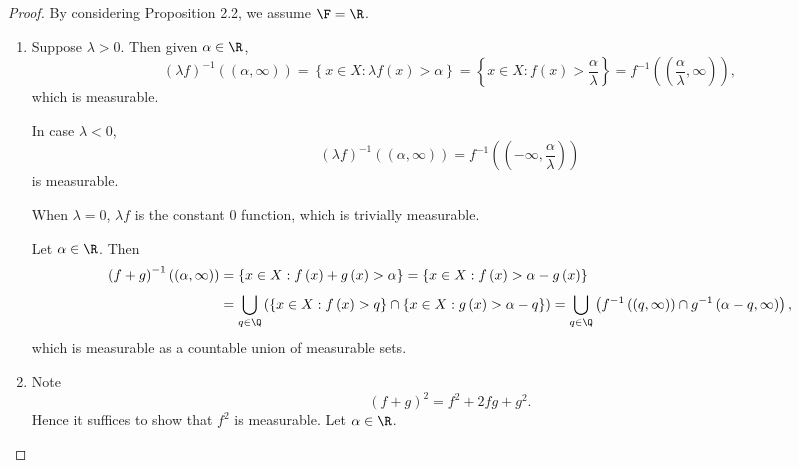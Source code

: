 \documentclass[pmath451]{subfiles}
\begin{document}
    \begin{proof}
        By considering Proposition 2.2, we assume $\F=\R$.

        \begin{enumerate}
            \item Suppose $\lambda>0$. Then given $\alpha\in\R$,
                \begin{equation*}
                    \left( \lambda f \right)^{-1}\left( \left( \alpha,\infty \right) \right) = \left\lbrace x\in X:\lambda f\left( x \right)>\alpha \right\rbrace = \left\lbrace x\in X: f\left( x \right) > \frac{\alpha}{\lambda} \right\rbrace = f^{-1}\left( \left( \frac{\alpha}{\lambda},\infty \right) \right),
                \end{equation*}
                which is measurable.

                In case $\lambda<0$,
                \begin{equation*}
                    \left( \lambda f \right)^{-1}\left( \left( \alpha,\infty \right) \right) = f^{-1}\left( \left( -\infty,\frac{\alpha}{\lambda} \right) \right)
                \end{equation*}
                is measurable.

                When $\lambda = 0$, $\lambda f$ is the constant $0$ function, which is trivially measurable.

                Let $\alpha\in\R$. Then
                \begin{equation*}
                    \begin{aligned}
                        \left( f+g \right)^{-1}\left( \left( \alpha,\infty \right) \right) & = \left\lbrace x\in X:f\left( x \right)+g\left( x \right)>\alpha \right\rbrace = \left\lbrace x\in X: f\left( x \right)>\alpha-g\left( x \right) \right\rbrace \\
                                                                                           & = \bigcup^{}_{q\in\Q} \left( \left\lbrace x\in X: f\left( x \right)>q \right\rbrace\cap \left\lbrace x\in X:g\left( x \right)>\alpha-q \right\rbrace \right) = \bigcup^{}_{q\in\Q} \left( f^{-1}\left( \left( q,\infty \right) \right)\cap g^{-1}\left( \alpha-q,\infty \right) \right),
                    \end{aligned} 
                \end{equation*}
                which is measurable as a countable union of measurable sets.

            \item Note
                \begin{equation*}
                    \left( f+g \right)^{2} = f^{2}+2fg+g^{2}.
                \end{equation*}
                Hence it suffices to show that $f^{2}$ is measurable. Let $\alpha\in\R$.


\end{enumerate}
\end{proof}
\end{document}
